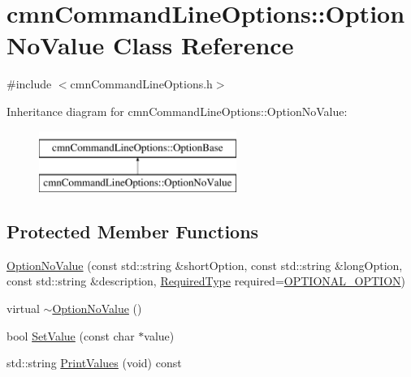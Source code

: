 \hypertarget{classcmn_command_line_options_1_1_option_no_value}{}\section{cmn\+Command\+Line\+Options\+:\+:Option\+No\+Value Class Reference}
\label{classcmn_command_line_options_1_1_option_no_value}


{\ttfamily \#include $<$cmn\+Command\+Line\+Options.\+h$>$}

Inheritance diagram for cmn\+Command\+Line\+Options\+:\+:Option\+No\+Value\+:\begin{figure}[H]
\begin{center}
\leavevmode
\includegraphics[height=2.000000cm]{df/d0d/classcmn_command_line_options_1_1_option_no_value}
\end{center}
\end{figure}
\subsection*{Protected Member Functions}
\begin{DoxyCompactItemize}
\item 
\hyperlink{classcmn_command_line_options_1_1_option_no_value_abbc22ac6ee5894a304bcb0406f6cb3ec}{Option\+No\+Value} (const std\+::string \&short\+Option, const std\+::string \&long\+Option, const std\+::string \&description, \hyperlink{group__cisst_common_gac239a3ca62dd4e3b391824f6f1a97c76}{Required\+Type} required=\hyperlink{group__cisst_common_ggac239a3ca62dd4e3b391824f6f1a97c76a6734a70bf0045a4c08605f3ae473d533}{O\+P\+T\+I\+O\+N\+A\+L\+\_\+\+O\+P\+T\+I\+O\+N})
\item 
virtual \hyperlink{classcmn_command_line_options_1_1_option_no_value_a8603a701052a041e6b199a1559536911}{$\sim$\+Option\+No\+Value} ()
\item 
bool \hyperlink{classcmn_command_line_options_1_1_option_no_value_ad033bac0fb01cf076f726f9461d9a484}{Set\+Value} (const char $\ast$value)
\item 
std\+::string \hyperlink{classcmn_command_line_options_1_1_option_no_value_aa25bb1ba7209a184281deb2d376dd7a1}{Print\+Values} (void) const 
\end{DoxyCompactItemize}
